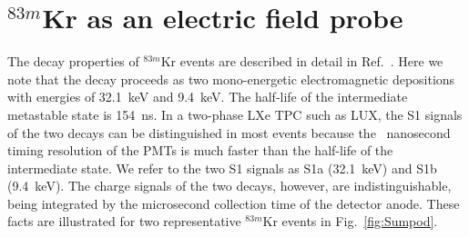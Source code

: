 

\section{$^{83m}$Kr as an electric field probe} \label{section:S1aS1b}






The decay properties of $^{83m}$Kr events are described in detail in Ref.~\cite{scottspaper}. Here we note 
that the decay proceeds as two mono-energetic electromagnetic depositions with energies of 
32.1~keV and 9.4~keV. The half-life of the intermediate metastable state is 154~ns. In a two-phase LXe
TPC such as LUX, the S1 signals of the two decays can be distinguished
in most events because the ~nanosecond timing resolution of the PMTs 
is much faster than the half-life of the intermediate state.  We refer
to the two S1 signals as S1a (32.1~keV) and S1b (9.4~keV). 
The charge signals of the two decays, however, are indistinguishable, being integrated
by the microsecond collection time of the detector anode. 
These facts are illustrated for two representative $^{83m}$Kr events 
in Fig.~\ref{fig:Sumpod}. 


